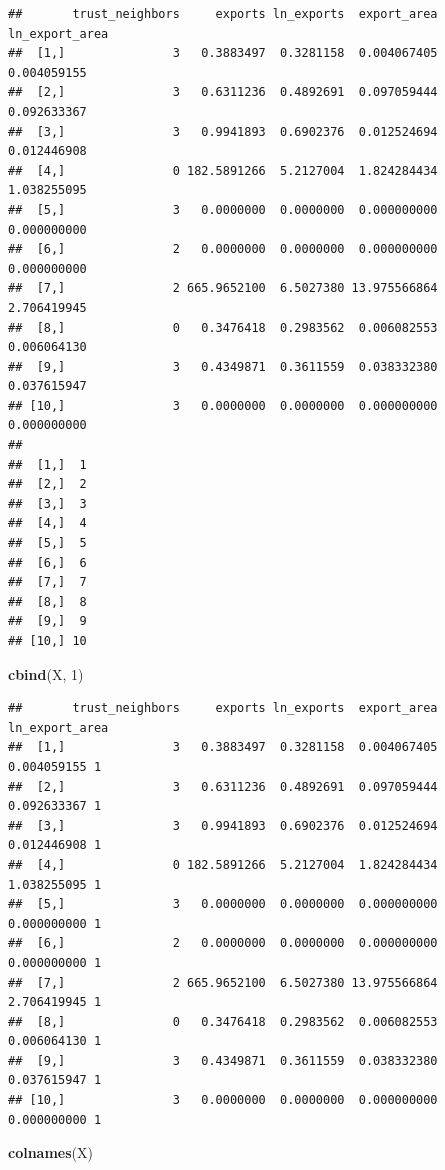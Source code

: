\documentclass[]{book}
\newenvironment{Shaded}{\begin{snugshade}}{\end{snugshade}}
\newcommand{\KeywordTok}[1]{\textcolor[rgb]{0.13,0.29,0.53}{\textbf{#1}}}
\newcommand{\DecValTok}[1]{\textcolor[rgb]{0.00,0.00,0.81}{#1}}
\newcommand{\NormalTok}[1]{#1}
\theoremstyle{definition}
\theoremstyle{definition}
\theoremstyle{definition}
\theoremstyle{remark}
\begin{document}
\begin{verbatim}
##       trust_neighbors     exports ln_exports  export_area ln_export_area
##  [1,]               3   0.3883497  0.3281158  0.004067405    0.004059155
##  [2,]               3   0.6311236  0.4892691  0.097059444    0.092633367
##  [3,]               3   0.9941893  0.6902376  0.012524694    0.012446908
##  [4,]               0 182.5891266  5.2127004  1.824284434    1.038255095
##  [5,]               3   0.0000000  0.0000000  0.000000000    0.000000000
##  [6,]               2   0.0000000  0.0000000  0.000000000    0.000000000
##  [7,]               2 665.9652100  6.5027380 13.975566864    2.706419945
##  [8,]               0   0.3476418  0.2983562  0.006082553    0.006064130
##  [9,]               3   0.4349871  0.3611559  0.038332380    0.037615947
## [10,]               3   0.0000000  0.0000000  0.000000000    0.000000000
##         
##  [1,]  1
##  [2,]  2
##  [3,]  3
##  [4,]  4
##  [5,]  5
##  [6,]  6
##  [7,]  7
##  [8,]  8
##  [9,]  9
## [10,] 10
\end{verbatim}

\begin{Shaded}
\begin{Highlighting}[]
\KeywordTok{cbind}\NormalTok{(X, }\DecValTok{1}\NormalTok{)}
\end{Highlighting}
\end{Shaded}

\begin{verbatim}
##       trust_neighbors     exports ln_exports  export_area ln_export_area  
##  [1,]               3   0.3883497  0.3281158  0.004067405    0.004059155 1
##  [2,]               3   0.6311236  0.4892691  0.097059444    0.092633367 1
##  [3,]               3   0.9941893  0.6902376  0.012524694    0.012446908 1
##  [4,]               0 182.5891266  5.2127004  1.824284434    1.038255095 1
##  [5,]               3   0.0000000  0.0000000  0.000000000    0.000000000 1
##  [6,]               2   0.0000000  0.0000000  0.000000000    0.000000000 1
##  [7,]               2 665.9652100  6.5027380 13.975566864    2.706419945 1
##  [8,]               0   0.3476418  0.2983562  0.006082553    0.006064130 1
##  [9,]               3   0.4349871  0.3611559  0.038332380    0.037615947 1
## [10,]               3   0.0000000  0.0000000  0.000000000    0.000000000 1
\end{verbatim}

\begin{Shaded}
\begin{Highlighting}[]
\KeywordTok{colnames}\NormalTok{(X)}
\end{Highlighting}
\end{Shaded}
\end{document}
